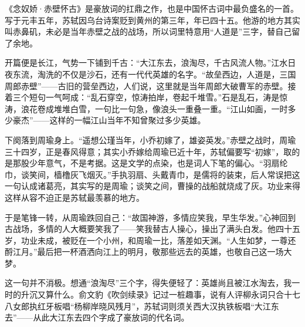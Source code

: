 \begin{appreciation}
《念奴娇·赤壁怀古》是豪放词的扛鼎之作，也是中国怀古词中最负盛名的一首。写于元丰五年，苏轼因乌台诗案贬到黄州的第三年，年已四十五。他游的地方其实叫赤鼻矶，未必是当年赤壁之战的战场，所以词里特意用“人道是”三字，替自己留了余地。

开篇便是长江，气势一下铺到千古：“大江东去，浪淘尽，千古风流人物。”江水日夜东流，淘洗的不仅是沙石，还有一代代英雄的名字。“故垒西边，人道是，三国周郎赤壁”——古旧的营垒西边，人们说，这里就是当年周郎大破曹军的赤壁。接着三个短句一气呵成：“乱石穿空，惊涛拍岸，卷起千堆雪。”石是乱石，涛是惊涛，浪花卷成堆堆白雪，一句比一句急，像浪头一重叠一重。“江山如画，一时多少豪杰”——这样的一幅江山当年不知曾聚过多少英雄。

下阕落到周瑜身上。“遥想公瑾当年，小乔初嫁了，雄姿英发。”赤壁之战时，周瑜三十四岁，正是春风得意；其实小乔嫁给周瑜已近十年，苏轼偏要写“初嫁”，取的是那股少年意气，不是考据。这是文学的点染，也是词人下笔的偏心。“羽扇纶巾，谈笑间，樯橹灰飞烟灭。”手执羽扇、头戴青巾，是儒将的装束，后人常误把这一句认成诸葛亮，其实写的是周瑜；谈笑之间，曹操的战船就烧成了灰。功业来得这样从容不迫正是苏轼最羡慕的地方。

于是笔锋一转，从周瑜跌回自己：“故国神游，多情应笑我，早生华发。”心神回到古战场，多情的人大概要笑我了——笑我替古人操心，操出了满头白发。他四十五岁，功业未成，被贬在一个小州，和周瑜一比，落差如天渊。“人生如梦，一尊还酹江月。”最后把一杯酒洒向江上的明月，敬那些远去的英雄，也敬自己这一场大梦。

这一句并不消极。想通“浪淘尽”三个字，得失便轻了：英雄尚且被江水淘去，我一时的升沉又算什么。俞文豹《吹剑续录》记过一桩趣事，说有人评柳永词只合十七八女郎执红牙板唱“杨柳岸晓风残月”，苏轼词则须关西大汉执铁板唱“大江东去”——从此大江东去四个字成了豪放词的代名词。
\end{appreciation}
